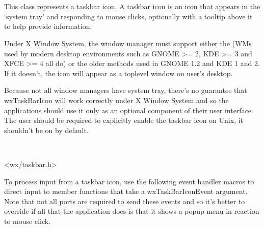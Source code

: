 \section{}\label{wxtaskbaricon}

This class represents a taskbar icon. A taskbar icon is an icon that appears in the `system tray' and responding to mouse clicks, optionally with a tooltip above it to help provide information.


Under X Window System, the window manager must support either
the 
(WMs used by modern desktop environments such as GNOME >= 2, KDE
>= 3 and XFCE >= 4 all do) or the older methods used in GNOME 1.2 and
KDE 1 and 2. If it doesn't, the icon will appear as a toplevel window on
user's desktop.

Because not all window managers have system tray, there's no guarantee that
wxTaskBarIcon will work correctly under X Window System and so the applications
should use it only as an optional component of their user interface. The user
should be required to explicitly enable the taskbar icon on Unix, it shouldn't
be on by default.



\\


<wx/taskbar.h>


To process input from a taskbar icon, use the following event handler macros to direct input to member
functions that take a wxTaskBarIconEvent argument. Note that not all ports are
required to send these events and so it's better to override
 if all that
the application does is that it shows a popup menu in reaction to mouse click.

\twocolwidtha{7cm}
\begin{twocollist}\itemsep=0pt
\end{twocollist}%

